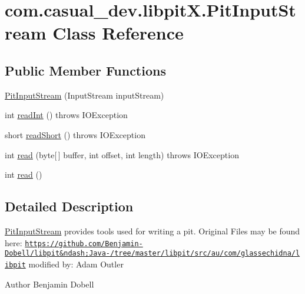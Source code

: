 \hypertarget{classcom_1_1casual__dev_1_1libpitX_1_1PitInputStream}{\section{com.\-casual\-\_\-dev.\-libpit\-X.\-Pit\-Input\-Stream Class Reference}
\label{classcom_1_1casual__dev_1_1libpitX_1_1PitInputStream}
}
\subsection*{Public Member Functions}
\begin{DoxyCompactItemize}
\item 
\hyperlink{classcom_1_1casual__dev_1_1libpitX_1_1PitInputStream_a68d4bb2f70bdd57a6593dddc301a6575}{Pit\-Input\-Stream} (Input\-Stream input\-Stream)
\item 
int \hyperlink{classcom_1_1casual__dev_1_1libpitX_1_1PitInputStream_a29529b12f4245d9f054e65f18f12ce3b}{read\-Int} ()  throws I\-O\-Exception 
\item 
short \hyperlink{classcom_1_1casual__dev_1_1libpitX_1_1PitInputStream_ad3bc358d082b94fef6578161f71eb424}{read\-Short} ()  throws I\-O\-Exception 
\item 
int \hyperlink{classcom_1_1casual__dev_1_1libpitX_1_1PitInputStream_a452e8741b4c760649254902ce16eabd5}{read} (byte\mbox{[}$\,$\mbox{]} buffer, int offset, int length)  throws I\-O\-Exception 
\item 
int \hyperlink{classcom_1_1casual__dev_1_1libpitX_1_1PitInputStream_ad3aa4199ce3c0e731bf73eb81dc90204}{read} ()
\end{DoxyCompactItemize}


\subsection{Detailed Description}
\hyperlink{classcom_1_1casual__dev_1_1libpitX_1_1PitInputStream}{Pit\-Input\-Stream} provides tools used for writing a pit. Original Files may be found here\-: \href{https://github.com/Benjamin-Dobell/libpit&ndash;Java-/tree/master/libpit/src/au/com/glassechidna/libpit}{\tt https\-://github.\-com/\-Benjamin-\/\-Dobell/libpit\&ndash;\-Java-\//tree/master/libpit/src/au/com/glassechidna/libpit} modified by\-: Adam Outler

\begin{DoxyAuthor}{Author}
Benjamin Dobell 
\end{DoxyAuthor}


